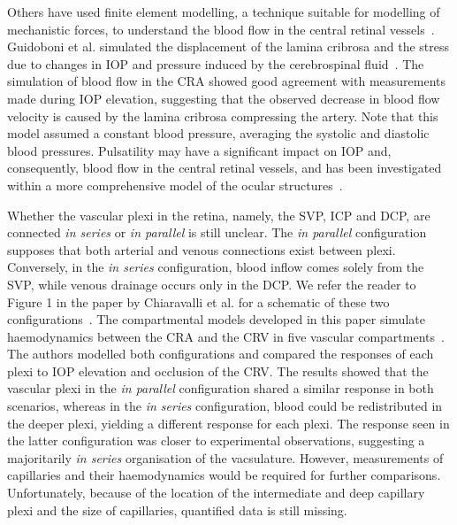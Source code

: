 \documentclass{article}
\begin{document}

Others have used finite element modelling, a technique suitable for modelling of mechanistic forces, to understand the blood flow in the central retinal vessels~\cite{Guidoboni_2014,Jin_2020}.
Guidoboni et al. simulated the displacement of the lamina cribrosa and the stress due to changes in IOP and pressure induced by the cerebrospinal fluid~\cite{Guidoboni_2014}.
The simulation of blood flow in the CRA showed good agreement with measurements made during IOP elevation, suggesting that the observed decrease in blood flow velocity is caused by the lamina cribrosa compressing the artery.
Note that this model assumed a constant blood pressure, averaging the systolic and diastolic blood pressures.
Pulsatility may have a significant impact on IOP and, consequently, blood flow in the central retinal vessels, and has been investigated within a more comprehensive model of the ocular structures~\cite{Jin_2020}.

Whether the vascular plexi in the retina, namely, the SVP, ICP and DCP, are connected \textit{in series} or \textit{in parallel} is still unclear.
The \textit{in parallel} configuration supposes that both arterial and venous connections exist between plexi.
Conversely, in the \textit{in series} configuration, blood inflow comes solely from the SVP, while venous drainage occurs only in the DCP.
We refer the reader to Figure 1 in the paper by Chiaravalli et al. for a schematic of these two configurations~\cite{Chiaravalli_2021}.
The compartmental models developed in this paper simulate haemodynamics between the CRA and the CRV in five vascular compartments~\cite{Chiaravalli_2021}.
The authors modelled both configurations and compared the responses of each plexi to IOP elevation and occlusion of the CRV.
The results showed that the vascular plexi in the \textit{in parallel} configuration shared a similar response in both scenarios, whereas in the \textit{in series} configuration, blood could be redistributed in the deeper plexi, yielding a different response for each plexi.
The response seen in the latter configuration was closer to experimental observations, suggesting a majoritarily \textit{in series} organisation of the vacsulature.
However, measurements of capillaries and their haemodynamics would be required for further comparisons.
Unfortunately, because of the location of the intermediate and deep capillary plexi and the size of capillaries, quantified data is still missing.
\end{document}
